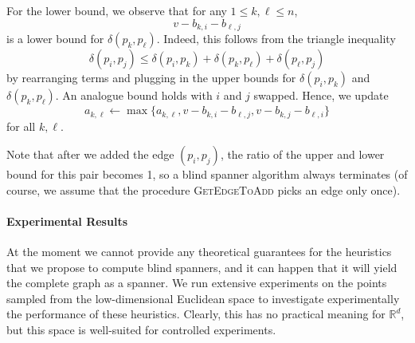 \documentclass[a4paper,USenglish]{socg-lipics-v2018}
\newcommand{\R}{\mathbb{R}}
\newcommand{\dist}{\delta}
\begin{document}
For the lower bound, we observe that for any $1\leq k,\ell\leq n$,
\[
    v-b_{k,i}-b_{\ell,j}
\]
is a lower bound for $\dist(p_k,p_\ell)$. Indeed, this follows from
the triangle inequality
%
\[\dist(p_i,p_j)\leq \dist(p_i,p_k)+\dist(p_k,p_\ell)+\dist(p_\ell,p_j)\]
by rearranging terms and plugging in the upper bounds for $\dist(p_i,p_k)$
and $\dist(p_k,p_\ell)$. An analogue bound holds with $i$ and $j$ swapped. Hence, we update
%
\[a_{k,\ell}\gets \max\{a_{k,\ell},v-b_{k,i}-b_{\ell,j},v-b_{k,j}-b_{\ell,i}\}\]
%
for all $k,\ell$.

Note that after we added the edge $(p_i, p_j)$, the ratio of the upper and lower bound
for this pair becomes 1, so a blind spanner algorithm always terminates (of course,
we assume that the procedure \textsc{GetEdgeToAdd} picks an edge only once).


\paragraph{Experimental Results}
At the moment we cannot provide any theoretical guarantees for the heuristics that we propose to compute blind spanners,
and it can happen that it will yield the complete graph as a spanner.
We run extensive experiments on the points sampled from the low-dimensional Euclidean space to investigate
experimentally the performance of these heuristics. Clearly, this has no practical meaning for $\R^d$, but
this space is well-suited for controlled experiments.
\end{document}
